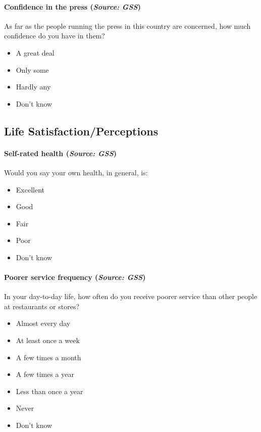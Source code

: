 \paragraph{Confidence in the press (\textit{Source: GSS})}
As far as the people running the press in this country are concerned, how much confidence do you have in them?
\begin{itemize}[itemsep=-10pt,topsep=0pt]
\item A great deal
\item Only some
\item Hardly any
\item Don’t know
\end{itemize}

\subsection{Life Satisfaction/Perceptions}

\paragraph{Self-rated health (\textit{Source: GSS})}
Would you say your own health, in general, is:
\begin{itemize}[itemsep=-10pt,topsep=0pt]
\item Excellent
\item Good
\item Fair
\item Poor
\item Don’t know
\end{itemize}

\paragraph{Poorer service frequency (\textit{Source: GSS})}
In your day-to-day life, how often do you receive poorer service than other people at restaurants or stores?
\begin{itemize}[itemsep=-10pt,topsep=0pt]
\item Almost every day
\item At least once a week
\item A few times a month
\item A few times a year
\item Less than once a year
\item Never
\item Don’t know
\end{itemize}

